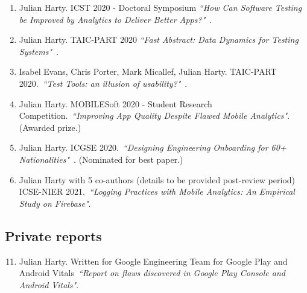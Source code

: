\begin{enumerate}
    \item Julian Harty. ICST 2020 - Doctoral Symposium \emph{``How Can Software Testing be Improved by Analytics to Deliver Better Apps?"}~\citep{harty2020_how_can_software_testing_be_improved_by_analytics_to_deliver_better_apps}.
    
    \item Julian Harty. TAIC-PART 2020 \emph{``Fast Abstract: Data Dynamics for Testing Systems"}~\citep{taicpart2020_accepted_papers_my_fast_abstract_until_ieee_upload_my_paper}.
    
    \item Isabel Evans, Chris Porter, Mark Micallef, Julian Harty. TAIC-PART 2020.~\emph{``Test Tools: an illusion of usability?"}~\citep{evans2020_test_tools_an_illusion_of_usability}.
    
    \item Julian Harty. MOBILESoft 2020 - Student Research Competition.~\emph{``Improving App Quality Despite Flawed Mobile Analytics"}. (Awarded  prize.)
    
    \item Julian Harty. ICGSE 2020.~\emph{``Designing Engineering Onboarding for 60+ Nationalities"}~\citep{harty2020_designing_engineering_onboarding}. (Nominated for best paper.)
    
    \item Julian Harty with 5 co-authors (details to be provided post-review period) ICSE-NIER 2021.~\emph{``Logging Practices with Mobile Analytics: An Empirical Study on Firebase"}.  

\end{enumerate}

\subsection{Private reports}
\begin{enumerate}

    \setcounter{enumi}{10}
    \item Julian Harty. Written for Google Engineering Team for Google Play and Android Vitals~\emph{``Report on flaws discovered in Google Play Console and Android Vitals"}.

\end{enumerate}

